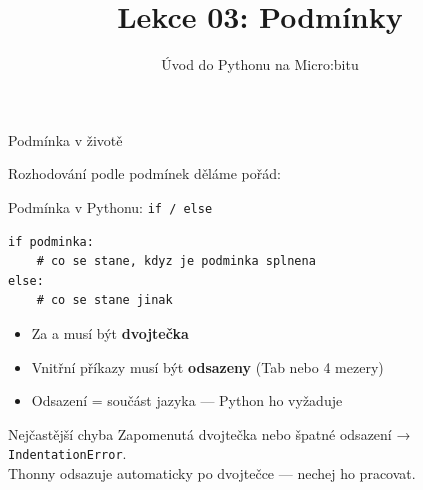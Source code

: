 

\title{Lekce 03: Podmínky}
\subtitle{Úvod do Pythonu na Micro:bitu}
\date{}



\begin{frame}
  \titlepage
\end{frame}

\begin{frame}{Podmínka v životě}

  Rozhodování podle podmínek děláme pořád:

  \begin{center}
  \end{center}
\end{frame}

\begin{frame}[fragile]{Podmínka v Pythonu: \texttt{if / else}}

  \begin{lstlisting}
if podminka:
    # co se stane, kdyz je podminka splnena
else:
    # co se stane jinak
  \end{lstlisting}

  \bigskip
  \begin{itemize}
    \item Za  a  musí být \textbf{dvojtečka}
    \item Vnitřní příkazy musí být \textbf{odsazeny} (Tab nebo 4 mezery)
    \item Odsazení = součást jazyka — Python ho vyžaduje
  \end{itemize}

  \pause\bigskip
  \begin{alertblock}{Nejčastější chyba}
    Zapomenutá dvojtečka nebo špatné odsazení → \texttt{IndentationError}.\\
    Thonny odsazuje automaticky po dvojtečce — nechej ho pracovat.
  \end{alertblock}
\end{frame}

